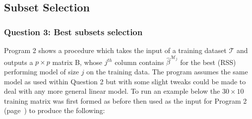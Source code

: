 \documentclass{article}
\begin{document}
\subsection{Subset Selection}

\subsubsection{Question 3: Best subsets selection}

Program 2 shows a procedure which takes the input of a training dataset $\mathcal{T}$  and outputs a $p \times p$ matrix B, whose $j^{th}$ column contains $\hat{\beta}^{\mathcal{M}_j}$ for the best (RSS) performing model of size $j$ on the training data. The program assumes the same model as used within Question 2 but with some slight tweaks could be made to deal with any more general linear model. To run an example below the $30 \times 10$ training matrix was first formed as before then used as the input for Program 2 (page~\pageref{subsec:Program 2}) to produce the following:
\end{document}
